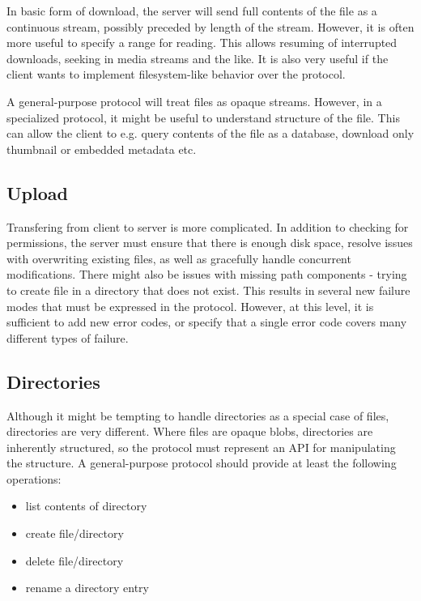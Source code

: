 In basic form of download, the server will send full contents of the file as a continuous stream, possibly
preceded by length of the stream. However, it is often more useful to specify a range for reading. This allows
resuming of interrupted downloads, seeking in media streams and the like. It is also very useful if the client
wants to implement filesystem-like behavior over the protocol.

A general-purpose protocol will treat files as opaque streams. However, in a specialized protocol, it might be
useful to understand structure of the file. This can allow the client to e.g. query contents of the file as
a database, download only thumbnail or embedded metadata etc.

\subsection{Upload}

Transfering from client to server is more complicated. In addition to checking for permissions, the server
must ensure that there is enough disk space, resolve issues with overwriting existing files, as well as
gracefully handle concurrent modifications. There might also be issues with missing path components - trying
to create file in a directory that does not exist. This results in several new failure modes that must be
expressed in the protocol. However, at this level, it is sufficient to add new error codes, or specify that
a single error code covers many different types of failure.

\subsection{Directories}

Although it might be tempting to handle directories as a special case of files, directories are very
different. Where files are opaque blobs, directories are inherently structured, so the protocol must represent
an API for manipulating the structure. A general-purpose protocol should provide at least the following
operations:

\begin{itemize}
	\item list contents of directory
	\item create file/directory
	\item delete file/directory
	\item rename a directory entry
\end{itemize}



